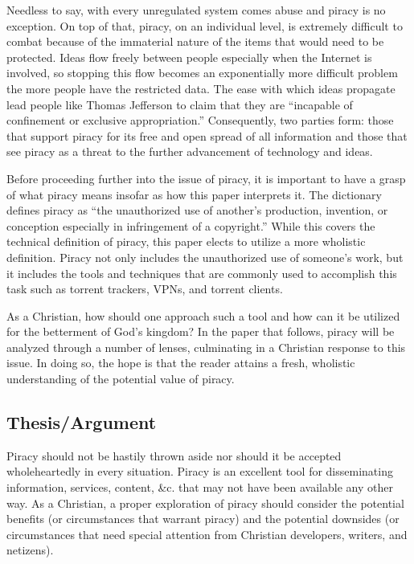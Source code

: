 \documentclass[onecolumn, 12pt]{article}
\begin{document}
\begin{refsection}
Needless to say, with every unregulated system comes abuse and piracy is no exception.
On top of that, piracy, on an individual level, is extremely difficult to combat because
of the immaterial nature of the items that would need to be protected. Ideas flow freely
between people especially when the Internet is involved, so stopping this flow becomes an
exponentially more difficult problem the more people have the restricted data. The ease
with which ideas propagate lead people like Thomas Jefferson to claim that they are
\enquote{incapable of confinement or exclusive appropriation.} Consequently, two parties form:
those that support piracy for its free and open spread of all information and those that
see piracy as a threat to the further advancement of technology and ideas.

Before proceeding further into the issue of piracy, it is important to have a grasp of
what piracy means insofar as how this paper interprets it. The dictionary defines piracy
as \enquote{the unauthorized use of another's production, invention, or conception especially in
infringement of a copyright.} While this covers the technical definition of piracy, this
paper elects to utilize a more wholistic definition. Piracy not only includes the
unauthorized use of someone's work, but it includes the tools and techniques that are
commonly used to accomplish this task such as torrent trackers, VPNs, and torrent clients.

As a Christian, how should one approach such a tool and how can it be utilized for the
betterment of God's kingdom? In the paper that follows, piracy will be analyzed through a
number of lenses, culminating in a Christian response to this issue. In doing so, the hope
is that the reader attains a fresh, wholistic understanding of the potential value of
piracy.

\subsection{Thesis/Argument}
Piracy should not be hastily thrown aside nor should it be accepted
wholeheartedly in every situation. Piracy is an excellent tool for
disseminating information, services, content, \&c. that may not have been
available any other way. As a Christian, a proper exploration of piracy should
consider the potential benefits (or circumstances that warrant piracy) and the
potential downsides (or circumstances that need special attention from
Christian developers, writers, and netizens).


\end{refsection}
\end{document}
